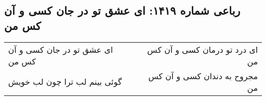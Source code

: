 \begin{center}
\section*{رباعی شماره ۱۴۱۹: ای عشق تو در جان کسی و آن کس من}
\label{sec:1419}
\begin{longtable}{l p{0.5cm} r}
ای عشق تو در جان کسی و آن کس من
&&
ای درد تو درمان کسی و آن کس من
\\
گوئی بینم لب ترا چون لب خویش
&&
مجروح به دندان کسی و آن کس من
\\
\end{longtable}
\end{center}

